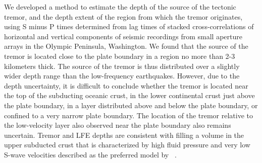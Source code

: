 \documentclass[draft]{agujournal2019}
\begin{document}
We developed a method to estimate the depth of the source of the tectonic tremor, and the depth extent of the region from which the tremor originates, using S minus P times determined from lag times of stacked cross-correlations of horizontal and vertical components of seismic recordings from small aperture arrays in the Olympic Peninsula, Washington. We found that the source of the tremor is located close to the plate boundary in a region no more than 2-3 kilometers thick. The source of the tremor is thus distributed over a slightly wider depth range than the low-frequency earthquakes. However, due to the depth uncertainty, it is difficult to conclude whether the tremor is located near the top  of the subducting oceanic crust, in the lower continental crust just above the plate boundary, in a layer distributed above and below the plate boundary, or confined to a very narrow plate boundary. The location of the tremor relative to the low-velocity layer also observed near the plate boundary also remains uncertain.  Tremor and LFE depths are consistent with filling a volume in the upper subducted crust that is characterized by high fluid pressure and very low S-wave velocities described as the preferred model by ~. \\





%
%
%
%
%
%
%
%
%
%
\end{document}
